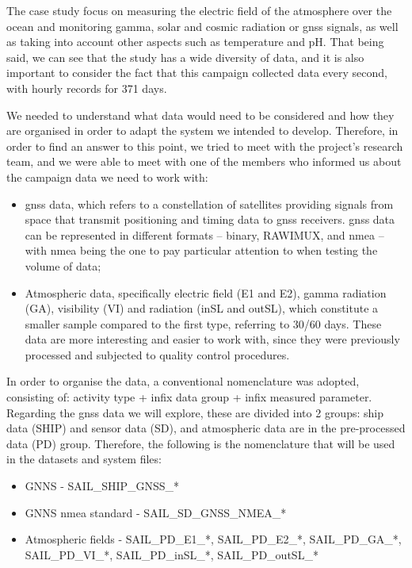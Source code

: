 The case study focus on measuring the electric field of the atmosphere over the ocean and monitoring gamma, solar and cosmic radiation or \gls{gnss} signals, as well as taking into account other aspects such as temperature and pH. That being said, we can see that the study has a wide diversity of data, and it is also important to consider the fact that this campaign collected data every second, with hourly records for 371 days.
  
We needed to understand what data would need to be considered and how they are organised in order to adapt the system we intended to develop. Therefore, in order to find an answer to this point, we tried to meet with the project's research team, and we were able to meet with one of the members who informed us about the campaign data we need to work with:

  
\begin{itemize}
    \item \gls{gnss} data, which refers to a constellation of satellites providing signals from space that transmit positioning and timing data to \gls{gnss} receivers. \gls{gnss} data can be represented in different formats -- binary, RAWIMUX, and \gls{nmea} -- with \gls{nmea} being the one to pay particular attention to  when testing the volume of data;
    \item Atmospheric data, specifically electric field (E1 and E2), gamma radiation (GA), visibility (VI) and radiation (inSL and outSL), which constitute a smaller sample compared to the first type, referring to 30/60 days. These data are more interesting and easier to work with, since they were previously processed and subjected to quality control procedures.
\end{itemize}

In order to organise the data, a conventional nomenclature was adopted, consisting of: activity type + infix data group + infix measured parameter. Regarding the \gls{gnss} data we will explore, these are divided into 2 groups: ship data (SHIP) and sensor data (SD), and atmospheric data are in the pre-processed data (PD) group. Therefore, the following is the nomenclature that will be used in the datasets and system files:

\begin{itemize}
    \item GNNS - SAIL\_SHIP\_GNSS\_*
    \item GNNS \gls{nmea} standard - SAIL\_SD\_GNSS\_NMEA\_*
    \item Atmospheric fields - SAIL\_PD\_E1\_*, SAIL\_PD\_E2\_*, SAIL\_PD\_GA\_*, SAIL\_PD\_VI\_*, SAIL\_PD\_inSL\_*, SAIL\_PD\_outSL\_*
\end{itemize}

